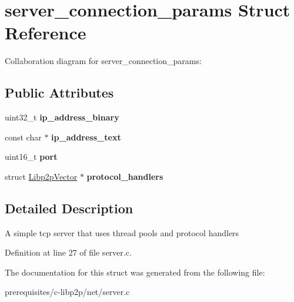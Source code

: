 \hypertarget{structserver__connection__params}{}\section{server\+\_\+connection\+\_\+params Struct Reference}
\label{structserver__connection__params}


Collaboration diagram for server\+\_\+connection\+\_\+params\+:
\subsection*{Public Attributes}
\begin{DoxyCompactItemize}
\item 
\mbox{\label{structserver__connection__params_a56cc54036da5692282e981ed2269ab99}} 
uint32\+\_\+t {\bfseries ip\+\_\+address\+\_\+binary}
\item 
\mbox{\label{structserver__connection__params_a4e1477d6775bf2096f3e96c38ec8be93}} 
const char $\ast$ {\bfseries ip\+\_\+address\+\_\+text}
\item 
\mbox{\label{structserver__connection__params_ad23bbf4ac1a6df2bd8ac7494cb57a9c9}} 
uint16\+\_\+t {\bfseries port}
\item 
\mbox{\label{structserver__connection__params_aadd91c548cb904702e7cb3983fd86dad}} 
struct \mbox{\hyperlink{struct_libp2p_vector}{Libp2p\+Vector}} $\ast$ {\bfseries protocol\+\_\+handlers}
\end{DoxyCompactItemize}


\subsection{Detailed Description}
A simple tcp server that uses thread pools and protocol handlers 

Definition at line 27 of file server.\+c.



The documentation for this struct was generated from the following file\+:\begin{DoxyCompactItemize}
\item 
prerequisites/c-\/libp2p/net/server.\+c\end{DoxyCompactItemize}
